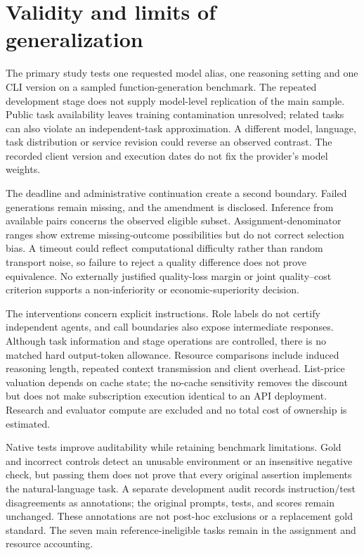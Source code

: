 \section{Validity and limits of generalization}
\label{sec:heldout-limits}
The primary study tests one requested model alias, one reasoning setting and one CLI version on a sampled function-generation benchmark. The repeated development stage does not supply model-level replication of the main sample. Public task availability leaves training contamination unresolved; related tasks can also violate an independent-task approximation. A different model, language, task distribution or service revision could reverse an observed contrast. The recorded client version and execution dates do not fix the provider's model weights.

The deadline and administrative continuation create a second boundary. Failed generations remain missing, and the amendment is disclosed. Inference from available pairs concerns the observed eligible subset. Assignment-denominator ranges show extreme missing-outcome possibilities but do not correct selection bias. A timeout could reflect computational difficulty rather than random transport noise, so failure to reject a quality difference does not prove equivalence. No externally justified quality-loss margin or joint quality--cost criterion supports a non-inferiority or economic-superiority decision.

The interventions concern explicit instructions. Role labels do not certify independent agents, and call boundaries also expose intermediate responses. Although task information and stage operations are controlled, there is no matched hard output-token allowance. Resource comparisons include induced reasoning length, repeated context transmission and client overhead. List-price valuation depends on cache state; the no-cache sensitivity removes the discount but does not make subscription execution identical to an API deployment. Research and evaluator compute are excluded and no total cost of ownership is estimated.

Native tests improve auditability while retaining benchmark limitations. Gold and incorrect controls detect an unusable environment or an insensitive negative check, but passing them does not prove that every original assertion implements the natural-language task. A separate development audit records instruction/test disagreements as annotations; the original prompts, tests, and scores remain unchanged. These annotations are not post-hoc exclusions or a replacement gold standard. The seven main reference-ineligible tasks remain in the assignment and resource accounting.


